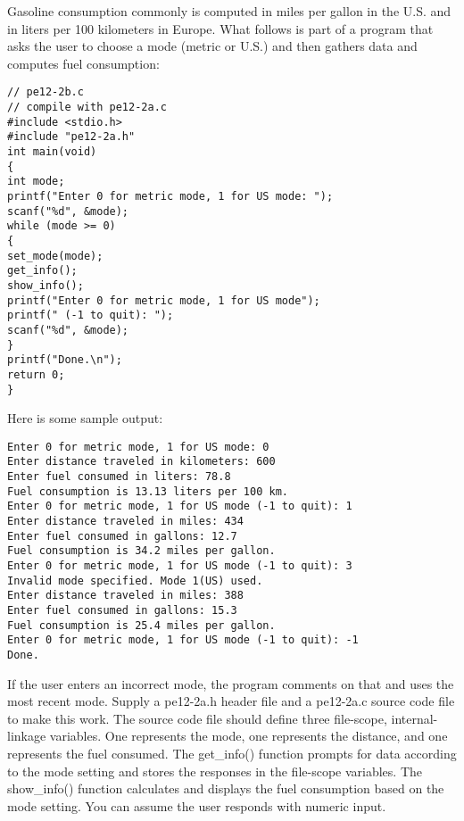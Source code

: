 \begin{question}
Gasoline consumption commonly is computed in miles per gallon in the U.S. and in
liters per 100 kilometers in Europe. What follows is part of a program that asks the user
to choose a mode (metric or U.S.) and then gathers data and computes fuel consumption:
\begin{verbatim}
// pe12-2b.c
// compile with pe12-2a.c
#include <stdio.h>
#include "pe12-2a.h"
int main(void)
{
int mode;
printf("Enter 0 for metric mode, 1 for US mode: ");
scanf("%d", &mode);
while (mode >= 0)
{
set_mode(mode);
get_info();
show_info();
printf("Enter 0 for metric mode, 1 for US mode");
printf(" (-1 to quit): ");
scanf("%d", &mode);
}
printf("Done.\n");
return 0;
}
\end{verbatim}
Here is some sample output:
\begin{verbatim}
Enter 0 for metric mode, 1 for US mode: 0
Enter distance traveled in kilometers: 600
Enter fuel consumed in liters: 78.8
Fuel consumption is 13.13 liters per 100 km.
Enter 0 for metric mode, 1 for US mode (-1 to quit): 1
Enter distance traveled in miles: 434
Enter fuel consumed in gallons: 12.7
Fuel consumption is 34.2 miles per gallon.
Enter 0 for metric mode, 1 for US mode (-1 to quit): 3
Invalid mode specified. Mode 1(US) used.
Enter distance traveled in miles: 388
Enter fuel consumed in gallons: 15.3
Fuel consumption is 25.4 miles per gallon.
Enter 0 for metric mode, 1 for US mode (-1 to quit): -1
Done.
\end{verbatim}
If the user enters an incorrect mode, the program comments on that and uses the most
recent mode. Supply a pe12-2a.h header file and a pe12-2a.c source code file to make
this work. The source code file should define three file-scope, internal-linkage variables.
One represents the mode, one represents the distance, and one represents the fuel
consumed. The get_info() function prompts for data according to the mode setting
and stores the responses in the file-scope variables. The show_info() function calculates
and displays the fuel consumption based on the mode setting. You can assume the user
responds with numeric input.
\end{question}
